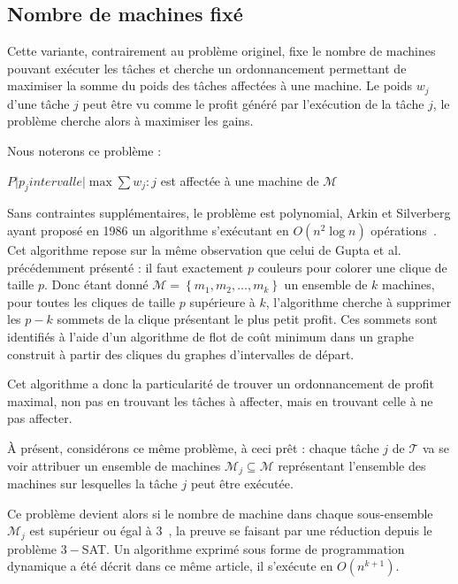 \documentclass[a4paper,11pt]{report}
\begin{document}
\subsection{Nombre de machines fixé}

Cette variante, contrairement au problème originel, fixe le nombre de machines pouvant exécuter les
tâches et cherche un ordonnancement permettant de maximiser la somme du poids des tâches affectées à
une machine. Le poids $w_j$ d'une tâche $j$ peut être vu comme le profit généré par l'exécution de
la tâche $j$, le problème cherche alors à maximiser les gains.

Nous noterons ce problème :
\begin{center}
    $P \Big| p_j intervalle \Big| \max \sum w_j : j$ est affectée à une machine de $\mathcal{M}$
\end{center}

Sans contraintes supplémentaires, le problème est polynomial, Arkin et Silverberg ayant proposé en
1986 un algorithme s'exécutant en $O(n^2 \log n)$ opérations~\cite{arkin_scheduling_1987}. Cet
algorithme repose sur la même observation que celui de Gupta et al.~\cite{gupta_optimal_1978} précédemment présenté : il faut
exactement $p$ couleurs pour colorer une clique de taille $p$. Donc étant donné $\mathcal{M}=\left\{
m_1, m_2, \dots, m_k \right\}$ un ensemble de $k$ machines, pour toutes les cliques de taille
$p$ supérieure à $k$, l'algorithme cherche à supprimer les $p -k$ sommets de la clique présentant
le plus petit profit. Ces sommets sont identifiés à l'aide d'un algorithme de flot de coût minimum
dans un graphe construit à partir des cliques du graphes d'intervalles de départ.

Cet algorithme a donc la particularité de trouver un ordonnancement de profit maximal, non pas en
trouvant les tâches à affecter, mais en trouvant celle à ne pas affecter.

À présent, considérons ce même problème, à ceci prêt : chaque tâche $j$ de $\mathcal{T}$ va se voir
attribuer un ensemble de machines $\mathcal{M}_j \subseteq \mathcal{M}$ représentant l'ensemble des
machines sur lesquelles la tâche $j$ peut être exécutée.

Ce problème devient alors \npc si le nombre de machine dans chaque sous-ensemble $\mathcal{M}_j$ est
supérieur ou égal à $3$~\cite{arkin_scheduling_1987}, la preuve se faisant par une réduction depuis
le problème \textsc{$3-$SAT}. Un algorithme exprimé sous forme de programmation dynamique a été
décrit dans ce même article, il s'exécute en $O(n^{k+1})$.
\end{document}
